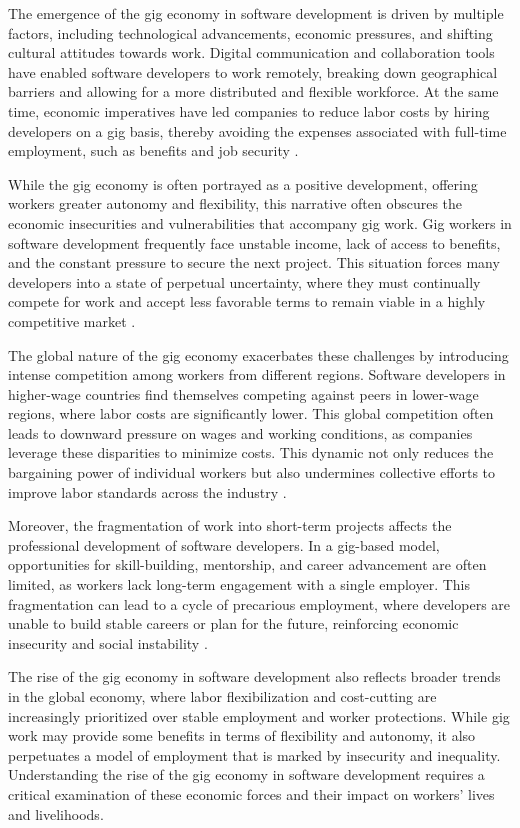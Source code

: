 The emergence of the gig economy in software development is driven by multiple factors, including technological advancements, economic pressures, and shifting cultural attitudes towards work. Digital communication and collaboration tools have enabled software developers to work remotely, breaking down geographical barriers and allowing for a more distributed and flexible workforce. At the same time, economic imperatives have led companies to reduce labor costs by hiring developers on a gig basis, thereby avoiding the expenses associated with full-time employment, such as benefits and job security \cite[pp.~56-59]{fuchs2014digital}.

While the gig economy is often portrayed as a positive development, offering workers greater autonomy and flexibility, this narrative often obscures the economic insecurities and vulnerabilities that accompany gig work. Gig workers in software development frequently face unstable income, lack of access to benefits, and the constant pressure to secure the next project. This situation forces many developers into a state of perpetual uncertainty, where they must continually compete for work and accept less favorable terms to remain viable in a highly competitive market \cite[pp.~67-70]{de2019gig}.

The global nature of the gig economy exacerbates these challenges by introducing intense competition among workers from different regions. Software developers in higher-wage countries find themselves competing against peers in lower-wage regions, where labor costs are significantly lower. This global competition often leads to downward pressure on wages and working conditions, as companies leverage these disparities to minimize costs. This dynamic not only reduces the bargaining power of individual workers but also undermines collective efforts to improve labor standards across the industry \cite[pp.~18-21]{scholz2017uberworked}.

Moreover, the fragmentation of work into short-term projects affects the professional development of software developers. In a gig-based model, opportunities for skill-building, mentorship, and career advancement are often limited, as workers lack long-term engagement with a single employer. This fragmentation can lead to a cycle of precarious employment, where developers are unable to build stable careers or plan for the future, reinforcing economic insecurity and social instability \cite[pp.~85-87]{kalleberg2009precarious}.

The rise of the gig economy in software development also reflects broader trends in the global economy, where labor flexibilization and cost-cutting are increasingly prioritized over stable employment and worker protections. While gig work may provide some benefits in terms of flexibility and autonomy, it also perpetuates a model of employment that is marked by insecurity and inequality. Understanding the rise of the gig economy in software development requires a critical examination of these economic forces and their impact on workers' lives and livelihoods.

